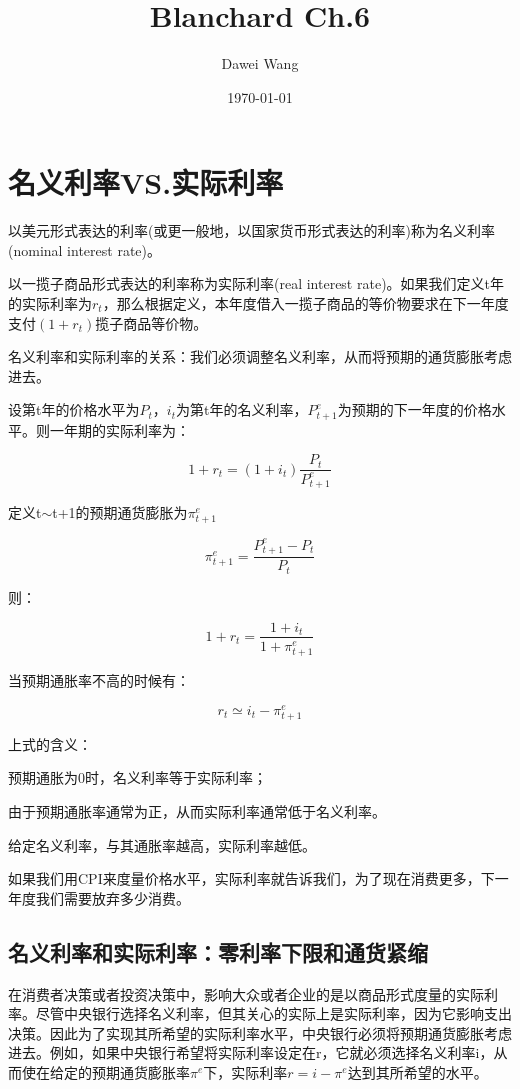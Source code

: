 \documentclass{article}
\title{Blanchard Ch.6}
\author{Dawei Wang}
\date{\today}
\begin{document}
	\maketitle

\section{名义利率VS.实际利率}

以美元形式表达的利率(或更一般地，以国家货币形式表达的利率)称为名义利率(nominal interest rate)。

以一揽子商品形式表达的利率称为实际利率(real interest rate)。如果我们定义t年的实际利率为$ r_t $，那么根据定义，本年度借入一揽子商品的等价物要求在下一年度支付$ (1+r_t) $揽子商品等价物。

名义利率和实际利率的关系：我们必须调整名义利率，从而将预期的通货膨胀考虑进去。

\hspace*{\fill}

设第t年的价格水平为$ P_t $，$ i_t $为第t年的名义利率，$ P_{t+1}^e $为预期的下一年度的价格水平。则一年期的实际利率为：

\[
1+r_t=(1+i_t)\frac{P_t}{P_{t+1}^e}
\]

定义t$\sim$t+1的预期通货膨胀为$ \pi_{t+1}^e $

\[
\pi_{t+1}^e=\frac{P_{t+1}^e-P_t}{P_t}
\]

则：

\[
1+r_t=\frac{1+i_t}{1+\pi_{t+1}^e}
\]

当预期通胀率不高的时候有：

\[
r_t\simeq i_t-\pi_{t+1}^e
\]

上式的含义：

预期通胀为0时，名义利率等于实际利率；

由于预期通胀率通常为正，从而实际利率通常低于名义利率。

给定名义利率，与其通胀率越高，实际利率越低。

如果我们用CPI来度量价格水平，实际利率就告诉我们，为了现在消费更多，下一年度我们需要放弃多少消费。

\subsection{名义利率和实际利率：零利率下限和通货紧缩}

在消费者决策或者投资决策中，影响大众或者企业的是以商品形式度量的实际利率。尽管中央银行选择名义利率，但其关心的实际上是实际利率，因为它影响支出决策。因此为了实现其所希望的实际利率水平，中央银行必须将预期通货膨胀考虑进去。例如，如果中央银行希望将实际利率设定在r，它就必须选择名义利率i，从而使在给定的预期通货膨胀率$ \pi^e $下，实际利率$ r=i-\pi^e $达到其所希望的水平。
\end{document}
